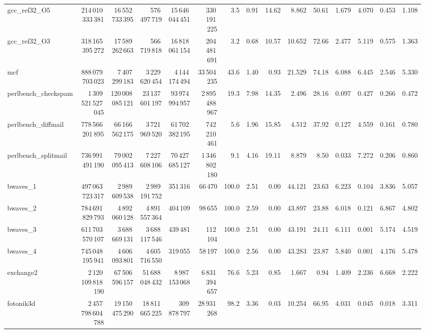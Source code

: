 \documentclass[9pt,landscape,a4paper]{article}
\begin{document}
\begin{adjustbox}{max width=\textwidth, max totalheight=0.50\textheight}
\begin{tabular}{lrrrrrrrrrrrrrr}
gcc\_ref32\_O5 & 214\,010\,333\,381 & 16\,552\,733\,395 & 576\,497\,719 & 15\,646\,044\,451 & 330\,191\,225 & 3.5 & 0.91 & 14.62 & 8.862 & 50.61 & 1.679 & 4.070 & 0.453 & 1.108 \\
gcc\_ref32\_O3 & 318\,165\,395\,272 & 17\,589\,262\,663 & 566\,719\,818 & 16\,818\,061\,154 & 204\,481\,691 & 3.2 & 0.68 & 10.57 & 10.652 & 72.66 & 2.477 & 5.119 & 0.575 & 1.363 \\
mcf & 888\,079\,703\,023 & 7\,407\,299\,183 & 3\,229\,620\,454 & 4\,144\,174\,494 & 33\,504\,235 & 43.6 & 1.40 & 0.93 & 21.529 & 74.18 & 6.088 & 6.445 & 2.546 & 5.330 \\
perlbench\_checkspam & 1\,309\,521\,527\,045 & 120\,008\,085\,121 & 23\,137\,601\,197 & 93\,974\,994\,957 & 2\,895\,488\,967 & 19.3 & 7.98 & 14.35 & 2.496 & 28.16 & 0.097 & 0.427 & 0.266 & 0.472 \\
perlbench\_diffmail & 778\,566\,201\,895 & 66\,166\,562\,175 & 3\,721\,969\,520 & 61\,702\,382\,195 & 742\,210\,461 & 5.6 & 1.96 & 15.85 & 4.512 & 37.92 & 0.127 & 4.559 & 0.161 & 0.780 \\
perlbench\_splitmail & 736\,991\,491\,190 & 79\,002\,095\,413 & 7\,227\,608\,106 & 70\,427\,685\,127 & 1\,346\,802\,180 & 9.1 & 4.16 & 19.11 & 8.879 & 8.50 & 0.033 & 7.272 & 0.206 & 0.860 \\
bwaves\_1 & 497\,063\,723\,317 & 2\,989\,609\,538 & 2\,989\,191\,752 & 351\,316 & 66\,470 & 100.0 & 2.51 & 0.00 & 44.121 & 23.63 & 6.223 & 0.104 & 3.836 & 5.057 \\
bwaves\_2 & 784\,691\,829\,793 & 4\,892\,060\,128 & 4\,891\,557\,364 & 404\,109 & 98\,655 & 100.0 & 2.59 & 0.00 & 43.897 & 23.88 & 6.018 & 0.121 & 6.867 & 4.802 \\
bwaves\_3 & 611\,703\,570\,107 & 3\,688\,669\,131 & 3\,688\,117\,546 & 439\,481 & 112\,104 & 100.0 & 2.51 & 0.00 & 43.191 & 24.11 & 6.111 & 0.001 & 5.174 & 4.519 \\
bwaves\_4 & 745\,048\,195\,941 & 4\,606\,093\,801 & 4\,605\,716\,550 & 319\,055 & 58\,197 & 100.0 & 2.56 & 0.00 & 43.283 & 23.87 & 5.840 & 0.001 & 4.176 & 5.478 \\
exchange2 & 2\,120\,109\,818\,190 & 67\,506\,596\,157 & 51\,688\,048\,432 & 8\,987\,153\,068 & 6\,831\,394\,657 & 76.6 & 5.23 & 0.85 & 1.667 & 0.94 & 1.409 & 2.236 & 6.668 & 2.222 \\
fotonik3d & 2\,457\,798\,604\,788 & 19\,150\,475\,290 & 18\,811\,665\,225 & 309\,878\,797 & 28\,931\,268 & 98.2 & 3.36 & 0.03 & 10.254 & 66.95 & 4.031 & 0.045 & 0.018 & 3.311 \\

\end{tabular}
\end{adjustbox}
\end{document}
